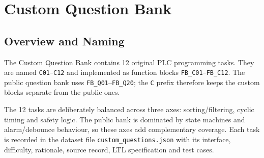 
\section{Custom Question Bank}
\label{sec:custom_question_bank}

\subsection{Overview and Naming}
The Custom Question Bank contains 12 original PLC programming tasks. They are named \texttt{C01}--\texttt{C12} and implemented as function blocks \texttt{FB\_C01}--\texttt{FB\_C12}. The public question bank uses \texttt{FB\_Q01}--\texttt{FB\_Q20}; the \texttt{C} prefix therefore keeps the custom blocks separate from the public ones.

The 12 tasks are deliberately balanced across three axes: sorting/filtering, cyclic timing and safety logic. The public bank is dominated by state machines and alarm/debounce behaviour, so these axes add complementary coverage. Each task is recorded in the dataset file \texttt{custom\_questions.json} with its interface, difficulty, rationale, source record, LTL specification and test cases.

